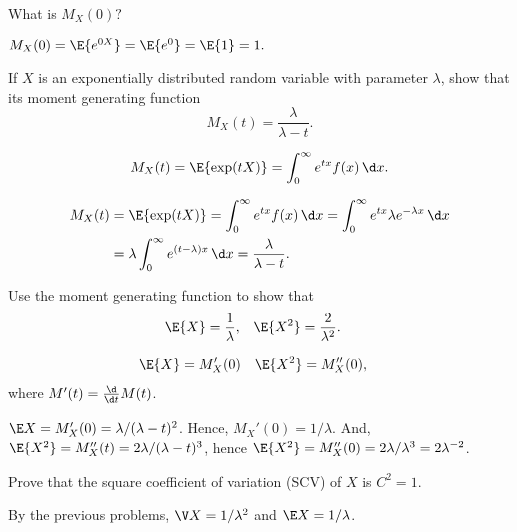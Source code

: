 \begin{exercise}
  What is $M_X(0)?$
  \begin{solution}
    $M_X(0) = \E{e^{0 X}} = \E{e^0} = \E{1} = 1.$
  \end{solution}
\end{exercise}

\begin{exercise}\label{ex:33}
 If $X$ is an exponentially distributed random variable with
    parameter $\lambda$, show that its moment generating function
    \begin{equation*}
    M_X(t) = \frac{\lambda}{\lambda-t}.
    \end{equation*}
   \begin{hint}
    \begin{equation*}
      M_X(t) = \E{\exp(t X)} =\int_0^\infty e^{t x} f(x) \,\d x.
\end{equation*}
\end{hint}
    \begin{solution}
    \begin{align*}
      M_X(t) &= \E{\exp(t X)}  
=\int_0^\infty e^{tx} f(x) \,\d x 
=\int_0^\infty e^{tx} \lambda e^{-\lambda x} \,\d x  \\
&=\lambda \int_0^\infty e^{(t-\lambda)x} \,\d x 
=\frac{\lambda}{\lambda -t}.
    \end{align*}
    \end{solution}
  \end{exercise}

\begin{exercise}
    Use the moment generating function to show that 
    \begin{align*}
      \E{X} &=\frac1\lambda, & 
      \E{X^2} &=\frac2{\lambda^2}.
    \end{align*}
\begin{hint}
    \begin{align*}
      \E{X} &= M_X'(0) &  \E{X^2} &= M_X''(0),
    \end{align*}
where $M'(t) = \frac{\d}{\d t} M(t)$. 
\end{hint}
\begin{solution}
  $\E X = M_X'(0)=\lambda/(\lambda-t)^2$. Hence, $M_X'(0)=1/\lambda$. And, $\E{X^2} = M_X''(t)=2\lambda/(\lambda-t)^3$, hence $\E{X^2}=M_X''(0)=2\lambda/\lambda^3=2\lambda^{-2}$. 
\end{solution}
  \end{exercise}

\begin{exercise}
  Prove that the square coefficient of variation (SCV) of $X$ is $C^2 =1$.  
\begin{solution}
  By the previous problems, $\V X = 1/\lambda^2$ and $\E X=1/\lambda$.
\end{solution}
\end{exercise}


